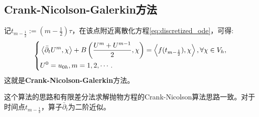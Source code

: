 \subsection{Crank-Nicolson-Galerkin方法}
记$t_{m-\frac{1}{2}}:=(m-\frac{1}{2})\tau$，在该点附近离散化方程\eqref{eq:discretized_ode}，可得:
\begin{equation}
    \label{eq:C-N-G}
    \left\{
        \begin{aligned}
        &\left<\bar{\partial}_{t}U^{m},\chi\right>+B\left(\frac{U^{m}+U^{m-1}}{2},\chi\right)=\left<f(t_{m-\frac{1}{2}}),\chi\right>,\forall \chi\in V_{h},\\
        &U^{0}=u_{0h},m=1,2,\cdots.\\
        \end{aligned}
    \right.
\end{equation}
这就是\textbf{Crank-Nicolson-Galerkin}方法。

\begin{remark}
    这个算法的思路和有限差分法求解抛物方程的Crank-Nicolson算法思路一致。对于时间点$t_{m-\frac{1}{2}}$，算子$\bar{\partial}_{t}$为二阶近似。
\end{remark}

